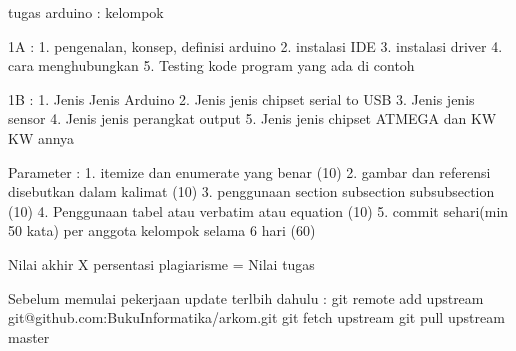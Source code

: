 tugas arduino :
kelompok

1A :
1. pengenalan, konsep, definisi arduino
2. instalasi IDE
3. instalasi driver
4. cara menghubungkan
5. Testing kode program yang ada di contoh

1B :
1. Jenis Jenis Arduino
2. Jenis jenis chipset serial to USB
3. Jenis jenis sensor
4. Jenis jenis perangkat output
5. Jenis jenis chipset ATMEGA dan KW KW annya



Parameter :
1. itemize dan enumerate yang benar (10)
2. gambar dan referensi disebutkan dalam kalimat (10)
3. penggunaan section subsection subsubsection (10)
4. Penggunaan tabel atau verbatim atau equation (10)
5. commit sehari(min 50 kata) per anggota kelompok selama 6 hari (60)

Nilai akhir X persentasi plagiarisme = Nilai tugas

Sebelum memulai pekerjaan update terlbih dahulu :
git remote add upstream git@github.com:BukuInformatika/arkom.git
git fetch upstream
git pull upstream master